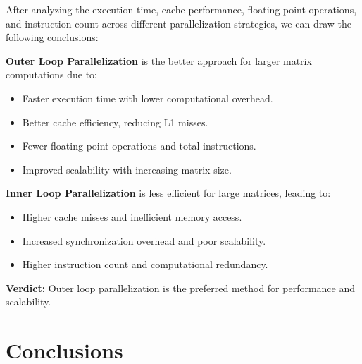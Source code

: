 \documentclass{article}
\begin{document}
After analyzing the execution time, cache performance, floating-point operations, and instruction count across different parallelization strategies, we can draw the following conclusions:


\textbf{Outer Loop Parallelization} is the better approach for larger matrix computations due to:

\begin{itemize}
    \item Faster execution time with lower computational overhead.
    \item Better cache efficiency, reducing L1 misses.
    \item Fewer floating-point operations and total instructions.
    \item Improved scalability with increasing matrix size.
\end{itemize}

\textbf{Inner Loop Parallelization} is less efficient for large matrices, leading to:

\begin{itemize}
    \item Higher cache misses and inefficient memory access.
    \item Increased synchronization overhead and poor scalability.
    \item Higher instruction count and computational redundancy.
\end{itemize}

\textbf{Verdict:} Outer loop parallelization is the preferred method for performance and scalability.

\section{Conclusions}
\end{document}
